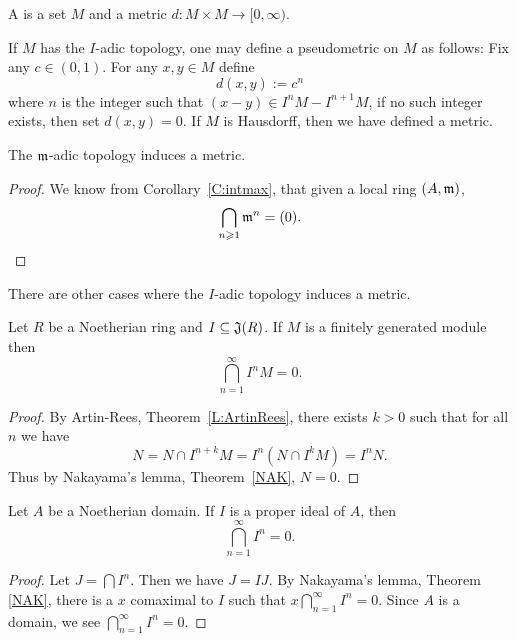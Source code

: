 \documentclass{ximera}
\begin{document}
\begin{definition}
  A  is a set $M$ and a metric $d:M\times M \to
  [0,\infty)$.
\end{definition}

If $M$ has the $I$-adic topology, one may define a
pseudometric on $M$ as follows: Fix any $c\in
(0,1)$. For any $x,y\in M$ define
\[
d(x,y) := c^n
\]
where $n$ is the integer such that $(x-y)\in I^nM-I^{n+1}M$, if no
such integer exists, then set $d(x,y) = 0$. If $M$ is
Hausdorff, then we have defined a metric.


\begin{corollary}
  The $\mathfrak{m}$-adic topology induces a metric.
  \begin{proof}
    We know from Corollary~\ref{C:intmax}, that given a local ring $(A,\mathfrak{m})$,
    \[
    \bigcap_{n\geqslant 1} \mathfrak{m}^n  = (0).
    \]
  \end{proof}
\end{corollary}

There are other cases where the $I$-adic topology induces a metric.

\begin{corollary}
  Let $R$ be a Noetherian ring and $I \subseteq \mathfrak J(R)$. If $M$ is a
  finitely generated module then
  \[
  \bigcap_{n=1}^\infty I^n M = 0.
  \]
  \begin{proof}
    By Artin-Rees, Theorem~\ref{L:ArtinRees}, there
    exists $k > 0$ such that for all $n$ we have
    \[
    N = N \cap I^{n + k}M = I^n(N \cap I^kM) = I^nN.
    \]
    Thus by Nakayama's lemma,
    Theorem~\ref{NAK}, $N = 0$.
  \end{proof}
\end{corollary}


\begin{corollary}
  Let $A$ be a Noetherian domain. If $I$ is a proper ideal of $A$,
  then
  \[
  \bigcap_{n=1}^\infty I^n = 0.
  \]
  \begin{proof}
    Let $J = \bigcap I^n$.  Then we have $J = I J$.  By Nakayama's
    lemma, Theorem \ref{NAK}, there is a $x$ comaximal to $I$ such
    that $x\bigcap_{n=1}^\infty I^n=0$.  Since $A$ is a domain, we see
    $\bigcap_{n=1}^\infty I^n=0$.
  \end{proof}
\end{corollary}
\end{document}
